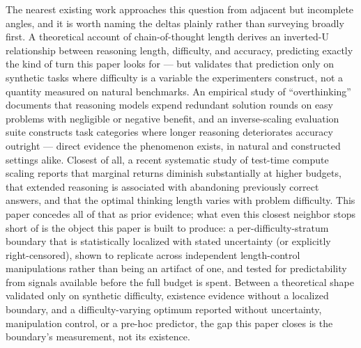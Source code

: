 \documentclass[11pt]{article}
\begin{document}
The nearest existing work approaches this question from adjacent but incomplete angles, and it is worth naming the deltas plainly rather than surveying broadly first. A theoretical account of chain-of-thought length \cite{WhenMoreIsLess6QDF} derives an inverted-U relationship between reasoning length, difficulty, and accuracy, predicting exactly the kind of turn this paper looks for --- but validates that prediction only on synthetic tasks where difficulty is a variable the experimenters construct, not a quantity measured on natural benchmarks. An empirical study of ``overthinking'' \cite{Chen2024Overthinking} documents that reasoning models expend redundant solution rounds on easy problems with negligible or negative benefit, and an inverse-scaling evaluation suite \cite{InverseScalingTTC2507} constructs task categories where longer reasoning deteriorates accuracy outright --- direct evidence the phenomenon exists, in natural and constructed settings alike. Closest of all, a recent systematic study of test-time compute scaling \cite{WhenMoreThinkingHurts2604} reports that marginal returns diminish substantially at higher budgets, that extended reasoning is associated with abandoning previously correct answers, and that the optimal thinking length varies with problem difficulty. This paper concedes all of that as prior evidence; what even this closest neighbor stops short of is the object this paper is built to produce: a per-difficulty-stratum boundary that is statistically localized with stated uncertainty (or explicitly right-censored), shown to replicate across independent length-control manipulations rather than being an artifact of one, and tested for predictability from signals available before the full budget is spent. Between a theoretical shape validated only on synthetic difficulty, existence evidence without a localized boundary, and a difficulty-varying optimum reported without uncertainty, manipulation control, or a pre-hoc predictor, the gap this paper closes is the boundary's measurement, not its existence.
\end{document}
